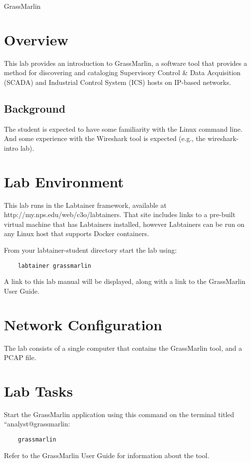 


\begin{center}
{\LARGE GrassMarlin}
\vspace{0.1in}\\
\end{center}

\section{Overview}
This lab provides an introduction to GrassMarlin, a software tool that provides a method for discovering and cataloging
Supervisory Control \& Data Acquisition (SCADA) and Industrial Control System (ICS) hosts on IP-based
networks.

\subsection {Background}
The student is expected to have some familiarity with the Linux command line.
And some experience with the Wireshark tool is expected (e.g., the wireshark-intro lab).

\section{Lab Environment}
This lab runs in the Labtainer framework,
available at http://my.nps.edu/web/c3o/labtainers.
That site includes links to a pre-built virtual machine
that has Labtainers installed, however Labtainers can
be run on any Linux host that supports Docker containers.

From your labtainer-student directory start the lab using:
\begin{verbatim}
    labtainer grassmarlin
\end{verbatim}
\noindent A link to this lab manual will be displayed, along with a link to the
GrassMarlin User Guide.


\section{Network Configuration}
The lab consists of a single computer that contains the GrassMarlin tool, and a PCAP file.

\section{Lab Tasks}
Start the GrassMarlin application using this command on the terminal titled ``analyst@grassmarlin:
\begin{verbatim}
    grassmarlin
\end{verbatim}
\noindent Refer to the GrassMarlin User Guide for information about the tool.

